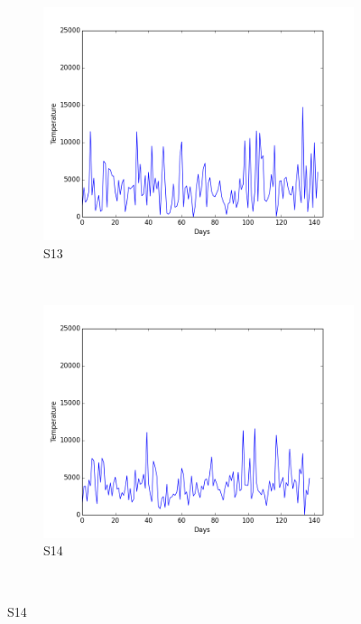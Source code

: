 \documentclass[12pt]{article} %
\begin{document}
\begin{figure}[H]
    \begin{subfigure}[b]{0.30\textwidth}
        \includegraphics[width=\textwidth]{img/graphs/13-steps-1}
        \caption{S13}
        \label{fig:s13Steps}
    \end{subfigure}
    ~ %
    \begin{subfigure}[b]{0.30\textwidth}
        \includegraphics[width=\textwidth]{img/graphs/14-steps-1}
        \caption{S14}
        \label{fig:s14Steps}
    \end{subfigure}
    ~ %

\end{figure}
\end{document}

